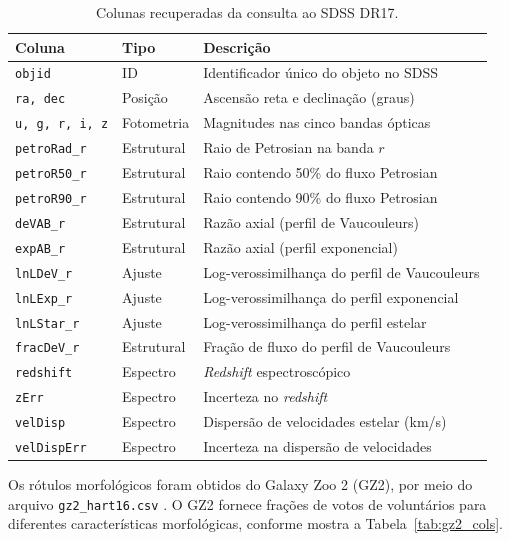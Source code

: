 \documentclass[12pt, a4paper]{article}
\begin{document}
\begin{table}[H]
  \centering
  \caption{Colunas recuperadas da consulta ao SDSS DR17.}
  \label{tab:sdss_cols}
  \begin{tabular}{llp{7.5cm}}
    \toprule
    \textbf{Coluna} & \textbf{Tipo} & \textbf{Descrição} \\
    \midrule
    \texttt{objid}       & ID      & Identificador único do objeto no SDSS \\
    \texttt{ra, dec}     & Posição & Ascensão reta e declinação (graus) \\
    \texttt{u, g, r, i, z} & Fotometria & Magnitudes nas cinco bandas ópticas \\
    \texttt{petroRad\_r} & Estrutural & Raio de Petrosian na banda $r$ \\
    \texttt{petroR50\_r} & Estrutural & Raio contendo 50\% do fluxo Petrosian \\
    \texttt{petroR90\_r} & Estrutural & Raio contendo 90\% do fluxo Petrosian \\
    \texttt{deVAB\_r}    & Estrutural & Razão axial (perfil de Vaucouleurs) \\
    \texttt{expAB\_r}    & Estrutural & Razão axial (perfil exponencial) \\
    \texttt{lnLDeV\_r}   & Ajuste & Log-verossimilhança do perfil de Vaucouleurs \\
    \texttt{lnLExp\_r}   & Ajuste & Log-verossimilhança do perfil exponencial \\
    \texttt{lnLStar\_r}  & Ajuste & Log-verossimilhança do perfil estelar \\
    \texttt{fracDeV\_r}  & Estrutural & Fração de fluxo do perfil de Vaucouleurs \\
    \texttt{redshift}    & Espectro & \textit{Redshift} espectroscópico \\
    \texttt{zErr}        & Espectro & Incerteza no \textit{redshift} \\
    \texttt{velDisp}     & Espectro & Dispersão de velocidades estelar (km/s) \\
    \texttt{velDispErr}  & Espectro & Incerteza na dispersão de velocidades \\
    \bottomrule
  \end{tabular}
\end{table}

Os rótulos morfológicos foram obtidos do Galaxy Zoo 2 (GZ2), por meio do
arquivo \texttt{gz2\_hart16.csv} \cite{hart2016}. O GZ2 fornece frações de
votos de voluntários para diferentes características morfológicas, conforme
mostra a Tabela~\ref{tab:gz2_cols}.
\end{document}
